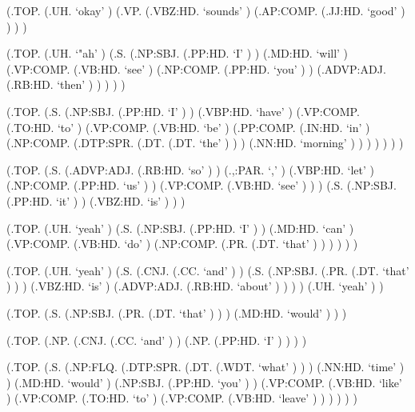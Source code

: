 \documentclass[10pt]{article}
\begin{document}
\begin{parsetree}  (.TOP. (.UH. `okay' ) (.VP. (.VBZ:HD. `sounds' ) (.AP:COMP. (.JJ:HD. `good' ) ) ) ) \end{parsetree}

\begin{parsetree}  (.TOP. (.UH. `"ah' ) (.S. (.NP:SBJ. (.PP:HD. `I' ) ) (.MD:HD. `will' ) (.VP:COMP. (.VB:HD. `see' ) (.NP:COMP. (.PP:HD. `you' ) ) (.ADVP:ADJ. (.RB:HD. `then' ) ) ) ) ) \end{parsetree}

\begin{parsetree}  (.TOP. (.S. (.NP:SBJ. (.PP:HD. `I' ) ) (.VBP:HD. `have' ) (.VP:COMP. (.TO:HD. `to' ) (.VP:COMP. (.VB:HD. `be' ) (.PP:COMP. (.IN:HD. `in' ) (.NP:COMP. (.DTP:SPR. (.DT. (.DT. `the' ) ) ) (.NN:HD. `morning' ) ) ) ) ) ) ) \end{parsetree}

\begin{parsetree}  (.TOP. (.S. (.ADVP:ADJ. (.RB:HD. `so' ) ) (.,:PAR. `,' ) (.VBP:HD. `let' ) (.NP:COMP. (.PP:HD. `us' ) ) (.VP:COMP. (.VB:HD. `see' ) ) ) (.S. (.NP:SBJ. (.PP:HD. `it' ) ) (.VBZ:HD. `is' ) ) ) \end{parsetree}

\begin{parsetree}  (.TOP. (.UH. `yeah' ) (.S. (.NP:SBJ. (.PP:HD. `I' ) ) (.MD:HD. `can' ) (.VP:COMP. (.VB:HD. `do' ) (.NP:COMP. (.PR. (.DT. `that' ) ) ) ) ) ) \end{parsetree}

\begin{parsetree}  (.TOP. (.UH. `yeah' ) (.S. (.CNJ. (.CC. `and' ) ) (.S. (.NP:SBJ. (.PR. (.DT. `that' ) ) ) (.VBZ:HD. `is' ) (.ADVP:ADJ. (.RB:HD. `about' ) ) ) ) (.UH. `yeah' ) ) \end{parsetree}

\begin{parsetree}  (.TOP. (.S. (.NP:SBJ. (.PR. (.DT. `that' ) ) ) (.MD:HD. `would' ) ) ) \end{parsetree}

\begin{parsetree}  (.TOP. (.NP. (.CNJ. (.CC. `and' ) ) (.NP. (.PP:HD. `I' ) ) ) ) \end{parsetree}

\begin{parsetree}  (.TOP. (.S. (.NP:FLQ. (.DTP:SPR. (.DT. (.WDT. `what' ) ) ) (.NN:HD. `time' ) ) (.MD:HD. `would' ) (.NP:SBJ. (.PP:HD. `you' ) ) (.VP:COMP. (.VB:HD. `like' ) (.VP:COMP. (.TO:HD. `to' ) (.VP:COMP. (.VB:HD. `leave' ) ) ) ) ) ) \end{parsetree}
\end{document}
